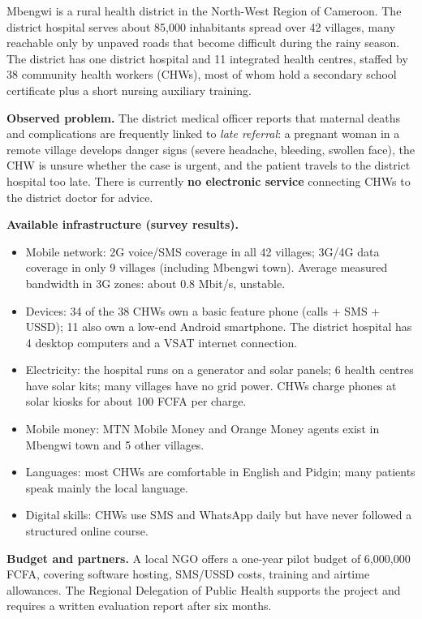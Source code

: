 \documentclass[11pt]{article}
\begin{document}
\begin{experience}
Mbengwi is a rural health district in the North-West Region of Cameroon. The district hospital serves about 85,000 inhabitants spread over 42 villages, many reachable only by unpaved roads that become difficult during the rainy season. The district has one district hospital and 11 integrated health centres, staffed by 38 community health workers (CHWs), most of whom hold a secondary school certificate plus a short nursing auxiliary training.

\textbf{Observed problem.} The district medical officer reports that maternal deaths and complications are frequently linked to \emph{late referral}: a pregnant woman in a remote village develops danger signs (severe headache, bleeding, swollen face), the CHW is unsure whether the case is urgent, and the patient travels to the district hospital too late. There is currently \textbf{no electronic service} connecting CHWs to the district doctor for advice.

\textbf{Available infrastructure (survey results).}
\begin{itemize}
\item Mobile network: 2G voice/SMS coverage in all 42 villages; 3G/4G data coverage in only 9 villages (including Mbengwi town). Average measured bandwidth in 3G zones: about 0.8 Mbit/s, unstable.
\item Devices: 34 of the 38 CHWs own a basic feature phone (calls + SMS + USSD); 11 also own a low-end Android smartphone. The district hospital has 4 desktop computers and a VSAT internet connection.
\item Electricity: the hospital runs on a generator and solar panels; 6 health centres have solar kits; many villages have no grid power. CHWs charge phones at solar kiosks for about 100 FCFA per charge.
\item Mobile money: MTN Mobile Money and Orange Money agents exist in Mbengwi town and 5 other villages.
\item Languages: most CHWs are comfortable in English and Pidgin; many patients speak mainly the local language.
\item Digital skills: CHWs use SMS and WhatsApp daily but have never followed a structured online course.
\end{itemize}

\textbf{Budget and partners.} A local NGO offers a one-year pilot budget of 6,000,000 FCFA, covering software hosting, SMS/USSD costs, training and airtime allowances. The Regional Delegation of Public Health supports the project and requires a written evaluation report after six months.
\end{experience}
\end{document}

